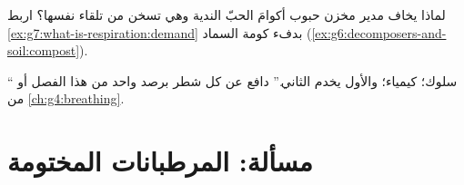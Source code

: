 \begin{exercise}[$\star\star$]\label{exo:g7:what-is-respiration:11}
لماذا يخاف مدير مخزن حبوب أكوامَ الحبّ الندية وهي تسخن من تلقاء
نفسها؟ اربط \cref{ex:g7:what-is-respiration:demand} بدفء كومة
السماد
(\cref{ex:g6:decomposers-and-soil:compost}).
\end{exercise}

\begin{exercise}[$\star\star\star$]\label{exo:g7:what-is-respiration:12}
`` سلوك؛  كيمياء؛ والأول يخدم الثاني.''
دافع عن كل شطر برصد واحد من هذا الفصل أو من
\cref{ch:g4:breathing}.
\end{exercise}

\section{مسألة: المرطبانات المختومة}

